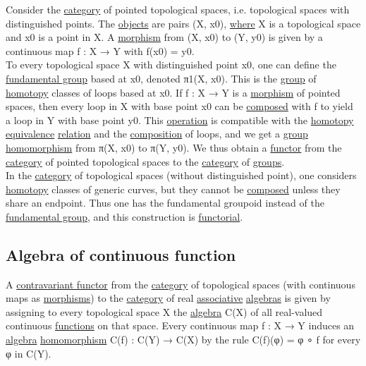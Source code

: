 \documentclass[11pt]{article}
\begin{document}
Consider the \hyperref[org0450535]{category} of pointed topological spaces, i.e. topological spaces with distinguished points. The \hyperref[org363acc2]{objects} are pairs (X, x0), \hyperref[org3e5903d]{where} X is a topological space and x0 is a point in X. A \hyperref[org5de09d4]{morphism} from (X, x0) to (Y, y0) is given by a continuous map f : X → Y with f(x0) = y0.\\

To every topological space X with distinguished point x0, one can define the \hyperref[org3662161]{fundamental group} based at x0, denoted π1(X, x0). This is the \hyperref[orgc937439]{group} of \hyperref[orgb19d3ed]{homotopy} classes of loops based at x0. If f : X → Y is a \hyperref[org5de09d4]{morphism} of pointed spaces, then every loop in X with base point x0 can be \hyperref[orgc78ac5d]{composed} with f to yield a loop in Y with base point y0. This \hyperref[org1173fe8]{operation} is compatible with the \hyperref[orgb19d3ed]{homotopy} \hyperref[orgbc0d2cd]{equivalence} \hyperref[orga5705a9]{relation} and the \hyperref[orga128e7f]{composition} of loops, and we get a \hyperref[orgc937439]{group} \hyperref[org4991058]{homomorphism} from π(X, x0) to π(Y, y0). We thus obtain a \hyperref[orgf2f6841]{functor} from the \hyperref[org0450535]{category} of pointed topological spaces to the \hyperref[org0450535]{category} of \hyperref[org734e757]{groups}.\\

In the \hyperref[org0450535]{category} of topological spaces (without distinguished point), one considers \hyperref[orgb19d3ed]{homotopy} classes of generic curves, but they cannot be \hyperref[orgc78ac5d]{composed} unless they share an endpoint. Thus one has the fundamental groupoid instead of the \hyperref[org3662161]{fundamental group}, and this construction is \hyperref[org443767a]{functorial}.\\

\subsection{\label{orgd52d9fc}Algebra of continuous function}
\label{sec:org8d0544f}

A \hyperref[orge5e36a5]{contravariant functor} from the \hyperref[org0450535]{category} of topological spaces (with continuous maps as \hyperref[org6c2fa5c]{morphisms}) to the \hyperref[org0450535]{category} of real \hyperref[orgbef8a27]{associative} \hyperref[org908535d]{algebras} is given by assigning to every topological space X the \hyperref[orgecfec51]{algebra} C(X) of all real-valued continuous \hyperref[orgaa8fb87]{functions} on that space. Every continuous map f : X → Y induces an \hyperref[orgecfec51]{algebra} \hyperref[org4991058]{homomorphism} C(f) : C(Y) → C(X) by the rule C(f)(φ) = φ ∘ f for every φ in C(Y).\\
\end{document}

